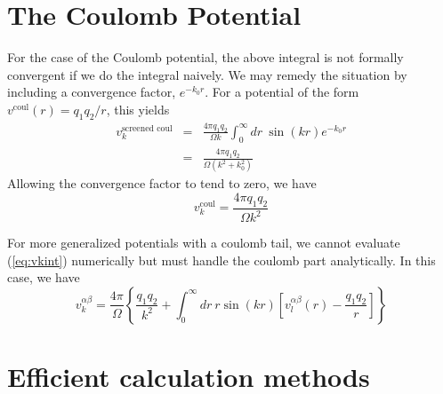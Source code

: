 \documentclass{article}
\begin{document}
\section{The Coulomb Potential}
For the case of the Coulomb potential, the above integral is not
formally convergent if we do the integral naively. We may remedy the
situation by including a convergence factor, $e^{-k_0 r}$.  For a
potential of the form $v^\text{coul}(r) = q_1 q_2/r$, this yields
\begin{eqnarray}
v^{\text{screened coul}}_k & = & \frac{4\pi q_1 q_2}{\Omega k} \int_0^\infty dr\ \sin(kr)
e^{-k_0r} \\ 
& = & \frac{4\pi q_1 q_2}{\Omega (k^2 + k_0^2)}
\end{eqnarray}
Allowing the convergence factor to tend to zero, we have
\begin{equation}
v_k^\text{coul} = \frac{4 \pi q_1 q_2}{\Omega k^2}
\end{equation}

For more generalized potentials with a coulomb tail, we cannot
evaluate (\ref{eq:vkint}) numerically but must handle the coulomb part
analytically.  In this case, we have
\begin{equation}
v_k^{\alpha \beta} = \frac{4\pi}{\Omega} 
\left\{ \frac{q_1 q_2}{k^2} + \int_0^\infty dr \ r \sin(kr) \left[ v_l^{\alpha \beta}(r) -
  \frac{q_1 q_2}{r} \right] \right\}
\end{equation}

\section{Efficient calculation methods}
\end{document}
